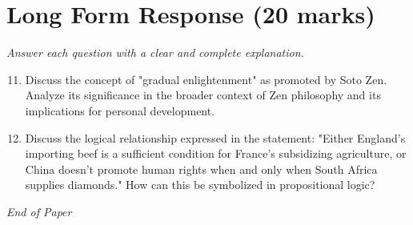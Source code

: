 \documentclass[12pt]{article}
\begin{document}
\section*{Long Form Response (20 marks)}
\textit{Answer each question with a clear and complete explanation.}
\begin{enumerate}[label=\arabic*.]
\setcounter{enumi}{10}
\item Discuss the concept of "gradual enlightenment" as promoted by Soto Zen. Analyze its significance in the broader context of Zen philosophy and its implications for personal development.
\item Discuss the logical relationship expressed in the statement: "Either England's importing beef is a sufficient condition for France's subsidizing agriculture, or China doesn't promote human rights when and only when South Africa supplies diamonds." How can this be symbolized in propositional logic?
\end{enumerate}

\vfill
\noindent\textit{End of Paper}
\end{document}
